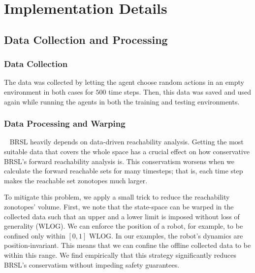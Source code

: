 \section{Implementation Details}

\subsection{Data Collection and Processing}
\subsubsection{Data Collection}
The data was collected by letting the agent choose random actions in an empty environment in both cases for $500$ time steps. Then, this data was saved and used again while running the agents in both the training and testing environments.

\subsubsection{Data Processing and Warping}~
BRSL heavily depends on data-driven reachability analysis.
Getting the most suitable data that covers the whole space has a crucial effect on how conservative BRSL's forward reachability analysis is.
This conservatism worsens when we calculate the forward reachable sets for many timesteps; that is, each time step makes the reachable set zonotopes much larger.

To mitigate this problem, we apply a small trick to reduce the reachability zonotopes' volume.
First, we note that the state-space can be warped in the collected data such that an upper and a lower limit is imposed without loss of generality (WLOG).
We can enforce the position of a robot, for example, to be confined only within $[0, 1]$ WLOG.
In our examples, the robot's dynamics are position-invariant.
This means that we can confine the offline collected data to be within this range. 
We find empirically that this strategy significantly reduces BRSL's conservatism without impeding safety guarantees.



